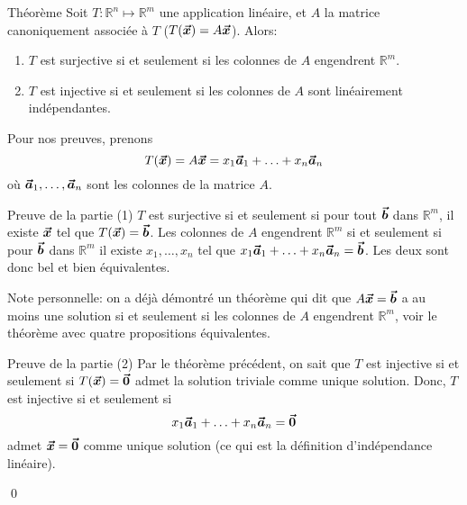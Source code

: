 \documentclass[a4paper]{article}
\begin{document}
\begin{parag}{Théorème}
    Soit $T: \mathbb{R}^{n} \mapsto \mathbb{R}^{m}$ une application linéaire, et $A$ la matrice canoniquement associée à $T$ ($T\left(\bvec{x}\right) = A \bvec{x}$). Alors:
    \begin{enumerate}
        \item $T$ est surjective si et seulement si les colonnes de $A$ engendrent $\mathbb{R}^{m}$.
        \item $T$ est injective si et seulement si les colonnes de $A$ sont linéairement indépendantes.
    \end{enumerate}

    Pour nos preuves, prenons
    \[T\left(\bvec{x}\right) = A \bvec{x} = x_1 \bvec{a}_1 + \ldots + x_n \bvec{a}_n\]
    où $\bm{\protect\vec{a}}_1, \ldots, \bm{\protect\vec{a}}_n$ sont les colonnes de la matrice $A$.

    \begin{subparag}{Preuve de la partie (1)}
        $T$ est surjective si et seulement si pour tout $\bm{\protect\vec{b}}$ dans $\mathbb{R}^{m}$, il existe $\bm{\protect\vec{x}}$ tel que $T\left(\bvec{x}\right) = \bvec{b}$. Les colonnes de $A$ engendrent $\mathbb{R}^{m}$ si et seulement si pour $\bm{\protect\vec{b}}$ dans $\mathbb{R}^{m}$ il existe $x_1, \ldots, x_n$ tel que $x_1 \bm{\protect\vec{a}}_1 + \ldots + x_n \bm{\protect\vec{a}}_n = \bm{\protect\vec{b}}$. Les deux sont donc bel et bien équivalentes.

        Note personnelle: on a déjà démontré un théorème qui dit que $A \bm{\protect\vec{x}} = \bm{\protect\vec{b}}$ a au moins une solution si et seulement si les colonnes de $A$ engendrent $\mathbb{R}^{m}$, voir le théorème avec quatre propositions équivalentes.
    \end{subparag}

    \begin{subparag}{Preuve de la partie (2)}
        Par le théorème précédent, on sait que $T$ est injective si et seulement si $T\left(\bvec{x}\right) = \bvec{0}$ admet la solution triviale comme unique solution. Donc, $T$ est injective si et seulement si
        \[x_1 \bm{\protect\vec{a}}_1 + \ldots + x_n \bm{\protect\vec{a}}_n = \bm{\protect\vec{0}}\]
        admet $\bm{\protect\vec{x}} = \bm{\protect\vec{0}}$ comme unique solution (ce qui est la définition d'indépendance linéaire).

        \qed
    \end{subparag}
\end{parag}
\end{document}
